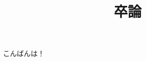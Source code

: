 \documentclass{jsarticle}
\title{卒論}
\theoremstyle{definition}
\begin{document}
\maketitle
こんばんは！
\end{document}
